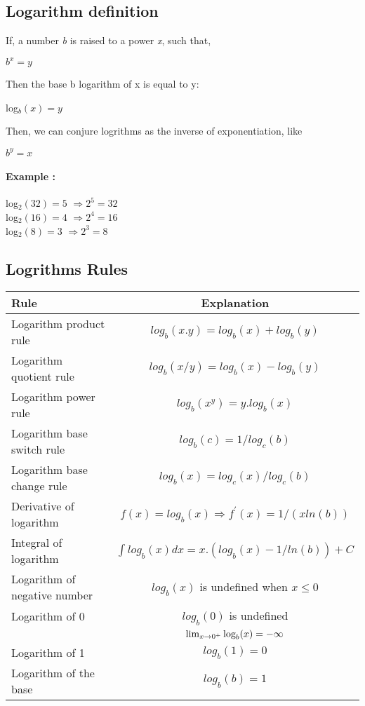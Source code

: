 \documentclass[12pt]{article}
\begin{document}
\subsection{Logarithm definition}

If, a number \textit{b} is raised to a power \textit{x}, such that,\\
\begin{center}	$b^{x} = y$		\end{center}

Then the base b logarithm of x is equal to y:

\begin{center} 	log$_{b}(x) = y$	\end{center}

Then, we can conjure logrithms as the inverse of exponentiation, like
\begin{center}	$b^{y} = x $		\end{center}
\paragraph{Example :\\}
\begin{center}
log$_{2}(32) = 5$	$\Rightarrow 2^{5} = 32 $
\\log$_{2}(16) = 4$ $\Rightarrow 2^{4} = 16 $
\\log$_{2}(8) = 3$ $\Rightarrow 2^{3} = 8 $
\end{center}

\subsection{Logrithms Rules}
\begin{tabular}{| l | c | }
	\hline	
		\textbf{Rule} & \textbf{Explanation} \\
		\hline
		\hline
		Logarithm product rule 		& $log_{b}(x . y) = log_{b}(x) + log_{b}(y)$ \\ \hline
		Logarithm quotient rule 		& $log_{b}(x / y) = log_{b}(x) - log_{b}(y)$ \\ \hline
		Logarithm power rule			& $log_{b}(x ^{y}) = y . log_{b}(x)$  \\ \hline
		Logarithm base switch rule 	& $log_{b}(c) = 1 / log_{c}(b)$	\\ \hline
		Logarithm base change rule 	& $log_{b}(x) = log_{c}(x) / log_{c}(b)$	\\ \hline
		Derivative of logarithm		& $f(x) = log_{b}(x) \Rightarrow f^{'}(x) = 1 / ( x ln(b))$ \\ \hline
		Integral of logarithm		& $\int log_{b}(x) dx = x . ( log_{b}(x) - 1 / ln(b) ) + C$  \\ \hline
		Logarithm of negative number & $log_{b}(x)$ is undefined when $x \le 0$   \\ \hline
		Logarithm of 0				& $log_{b}(0)$ is undefined \\ & $\lim_{x\to 0^+}\textup{log}_b(x)=-\infty$   \\ \hline
		Logarithm of 1				& $log_{b}(1) = 0$  \\ \hline
		Logarithm of the base		& $log_{b}(b) = 1$  \\ \hline
\end{tabular}
\end{document}
